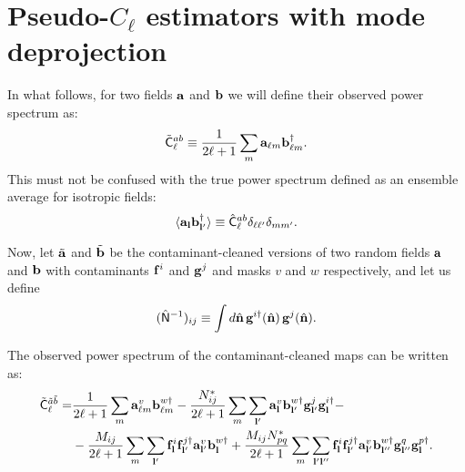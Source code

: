 \documentclass[a4paper,10pt]{article}
\newcommand{\nv}{\hat{\bf n}}
\begin{document}
\section{Pseudo-$C_\ell$ estimators with mode deprojection}  
  In what follows, for two fields ${\bf a}$ and ${\bf b}$ we will define their observed power spectrum as:
  \begin{equation}
    \tilde{\sf C}^{ab}_{\ell}\equiv\frac{1}{2\ell+1}\sum_m{\bf a}_{\ell m}{\bf b}^\dag_{\ell m}.
  \end{equation}
  This must not be confused with the true power spectrum defined as an ensemble average for isotropic fields:
  \begin{equation}
    \langle{\bf a}_{{\bf l}}{\bf b}^\dag_{{\bf l}'}\rangle\equiv\hat{\sf C}^{ab}_\ell\delta_{\ell\ell'}\delta_{mm'}.
  \end{equation}


  Now, let $\tilde{\bf a}$ and $\tilde{\bf b}$ be the contaminant-cleaned versions of two random fields ${\bf a}$ and ${\bf b}$ with contaminants ${\bf f}^i$ and ${\bf g}^j$ and masks $v$ and $w$ respectively, and let us define
  \begin{equation}
    (\hat{\sf N}^{-1})_{ij}\equiv\int d\nv\, {\bf g}^{i\dag}(\nv)\,{\bf g}^j(\nv).
  \end{equation}

  The observed power spectrum of the contaminant-cleaned maps can be written as:
  \begin{align}\nonumber
   \tilde{\sf C}^{\tilde{a}\tilde{b}}_\ell=&
   \frac{1}{2\ell+1}\sum_m{\bf a}^v_{\ell m}{\bf b}^{w\dag}_{\ell m}-\frac{N^*_{ij}}{2\ell+1}\sum_m\sum_{{\bf l}'}{\bf a}^v_{{\bf l}}{\bf b}^{w\dag}_{{\bf l}'}{\bf g}^{j}_{{\bf l}'}{\bf g}^{i\dag}_{\bf l}-\\
   &-\frac{M_{ij}}{2\ell+1}\sum_m\sum_{{\bf l}'}{\bf f}^{i}_{{\bf l}}{\bf f}^{j\dag}_{{\bf l}'}{\bf a}^v_{{\bf l}'}{\bf b}^{w\dag}_{\bf l}+\frac{M_{ij}N^*_{pq}}{2\ell+1}\sum_m\sum_{{\bf l}'{\bf l}''}{\bf f}^{i}_{{\bf l}}{\bf f}^{j\dag}_{{\bf l}'}{\bf a}^v_{{\bf l}'}{\bf b}^{w\dag}_{{\bf l}''}{\bf g}^{q}_{{\bf l}''}{\bf g}^{p\dag}_{\bf l}.
  \end{align}
  
\end{document}
